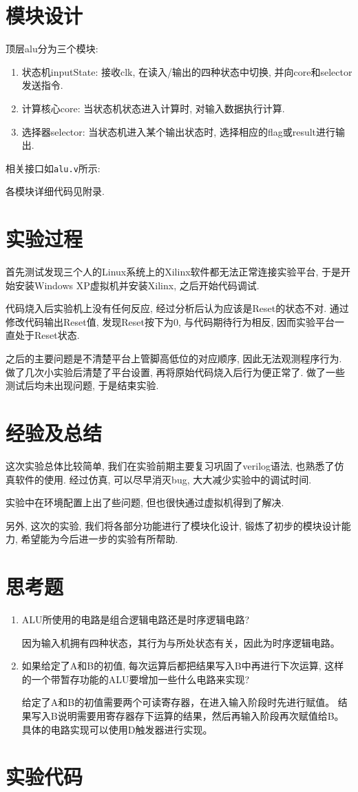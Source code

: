 \section{模块设计}
顶层alu分为三个模块:
\begin{enumerate}
  \item 状态机inputState: 接收clk, 在读入/输出的四种状态中切换, 并向core和selector发送指令.
  \item 计算核心core: 当状态机状态进入计算时, 对输入数据执行计算.
  \item 选择器selector: 当状态机进入某个输出状态时, 选择相应的flag或result进行输出.
\end{enumerate}
相关接口如\verb|alu.v|所示:

各模块详细代码见附录.

\section{实验过程}
首先测试发现三个人的Linux系统上的Xilinx软件都无法正常连接实验平台,
于是开始安装Windows XP虚拟机并安装Xilinx, 之后开始代码调试.

代码烧入后实验机上没有任何反应, 经过分析后认为应该是Reset的状态不对.
通过修改代码输出Reset值, 发现Reset按下为0, 与代码期待行为相反, 因而实验平台一直处于Reset状态.

之后的主要问题是不清楚平台上管脚高低位的对应顺序, 因此无法观测程序行为.
做了几次小实验后清楚了平台设置, 再将原始代码烧入后行为便正常了.
做了一些测试后均未出现问题, 于是结束实验.

\section{经验及总结}
这次实验总体比较简单, 我们在实验前期主要复习巩固了verilog语法,
也熟悉了仿真软件的使用.
经过仿真, 可以尽早消灭bug, 大大减少实验中的调试时间.

实验中在环境配置上出了些问题, 但也很快通过虚拟机得到了解决.

另外, 这次的实验, 我们将各部分功能进行了模块化设计,
锻炼了初步的模块设计能力, 希望能为今后进一步的实验有所帮助.

\section{思考题}
\begin{enumerate}
  \item ALU所使用的电路是组合逻辑电路还是时序逻辑电路?

    因为输入机拥有四种状态，其行为与所处状态有关，因此为时序逻辑电路。

  \item 如果给定了A和B的初值, 每次运算后都把结果写入B中再进行下次运算,
    这样的一个带暂存功能的ALU要增加一些什么电路来实现?

    给定了A和B的初值需要两个可读寄存器，在进入输入阶段时先进行赋值。
    结果写入B说明需要用寄存器存下运算的结果，然后再输入阶段再次赋值给B。
    具体的电路实现可以使用D触发器进行实现。

\end{enumerate}


\section{实验代码}
